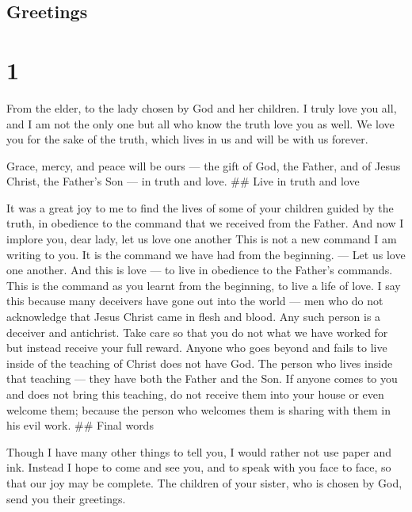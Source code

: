 \hypertarget{greetings}{%
\subsection{Greetings}\label{greetings}}

\hypertarget{section}{%
\section{1}\label{section}}

 From the elder, to the lady chosen by God and her children.
I truly love you all, and I am not the only one but all who know the
truth love you as well.  We love you for the sake of the
truth, which lives in us and will be with us forever.

 Grace, mercy, and peace will be ours --- the gift of God,
the Father, and of Jesus Christ, the Father's Son --- in truth and love.
\#\# Live in truth and love

 It was a great joy to me to find the lives of some of your
children guided by the truth, in obedience to the command that we
received from the Father.  And now I implore you, dear lady,
let us love one another This is not a new command I am writing to you.
It is the command we have had from the beginning. --- Let us love one
another.  And this is love --- to live in obedience to the
Father's commands. This is the command as you learnt from the beginning,
to live a life of love.  I say this because many deceivers
have gone out into the world --- men who do not acknowledge that Jesus
Christ came in flesh and blood. Any such person is a deceiver and
antichrist.  Take care so that you do not what we have
worked for but instead receive your full reward.  Anyone who
goes beyond and fails to live inside of the teaching of Christ does not
have God. The person who lives inside that teaching --- they have both
the Father and the Son.  If anyone comes to you and does
not bring this teaching, do not receive them into your house or even
welcome them;  because the person who welcomes them is
sharing with them in his evil work. \#\# Final words

 Though I have many other things to tell you, I would
rather not use paper and ink. Instead I hope to come and see you, and to
speak with you face to face, so that our joy may be complete.
 The children of your sister, who is chosen by God, send
you their greetings.
